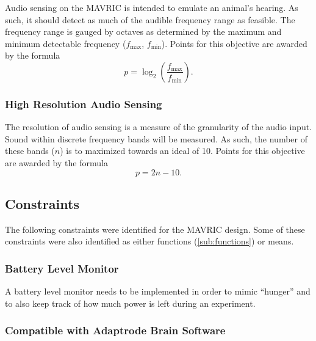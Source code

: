 \documentclass{article}
\begin{document}
            Audio sensing on the MAVRIC is intended
            to emulate an animal's hearing.
            As such, it should detect as much
            of the audible frequency range as feasible.
            The frequency range is gauged by octaves
            as determined by the maximum and minimum detectable frequency
            ($f_\text{max}$, $f_\text{min}$).
            Points for this objective are awarded by the formula
            \begin{equation}
                p = \log_2\left( \frac{f_\text{max}}{f_\text{min}} \right).
            \end{equation}

        \subsubsection{High Resolution Audio Sensing}
        
            The resolution of audio sensing is a measure
            of the granularity of the audio input.
            Sound within discrete frequency bands will be measured.
            As such, the number of these bands ($n$)
            is to maximized towards an ideal of 10.
            Points for this objective are awarded by the formula
            \begin{equation}
                p = 2n - 10.
            \end{equation}
    
    \subsection{Constraints}
        \label{sub:constraints}
        
        The following constraints were identified for the
        MAVRIC design. Some of these constraints were also
        identified as either functions (\ref{sub:functions}) or means.

        \subsubsection{Battery Level Monitor}
        
            A battery level monitor needs to be implemented
            in order to mimic ``hunger'' and to also keep track
            of how much power is left during an experiment.

        \subsubsection{Compatible with Adaptrode Brain Software}
        
\end{document}

